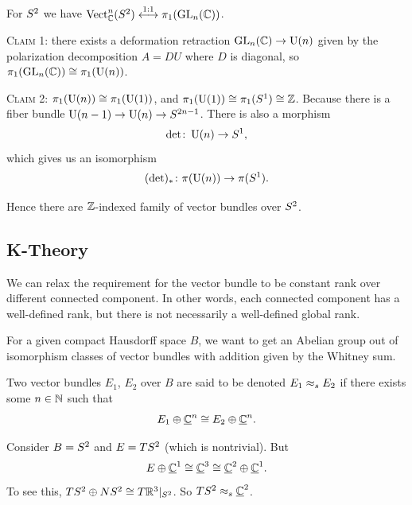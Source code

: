 \begin{node}
For $S^{2}$ we have
$\operatorname{Vect}^{n}_{\mathbb{C}}(S^{2})\stackrel{1:1}{\longleftrightarrow}\pi_{1}(\operatorname{GL}_{n}(\mathbb{C}))$.

\textsc{Claim 1}: there exists a deformation retraction $\operatorname{GL}_{n}(\mathbb{C})\to\operatorname{U}(n)$
given by the polarization decomposition $A=DU$ where $D$ is diagonal,
so $\pi_{1}(\operatorname{GL}_{n}(\mathbb{C}))\cong\pi_{1}(\operatorname{U}(n))$.

\textsc{Claim 2}: $\pi_{1}(\operatorname{U}(n))\cong\pi_{1}(\operatorname{U}(1))$, and
$\pi_{1}(\operatorname{U}(1))\cong\pi_{1}(S^{1})\cong\mathbb{Z}$. Because there is a
fiber bundle $\operatorname{U}(n-1)\to\operatorname{U}(n)\to S^{2n-1}$. There is also a morphism
\begin{equation}
\det\colon\operatorname{U}(n)\to S^{1},
\end{equation}
which gives us an isomorphism
\begin{equation}
(\det)_{*}\colon\pi(\operatorname{U}(n))\to\pi(S^{1}).
\end{equation}

Hence there are $\mathbb{Z}$-indexed family of vector bundles over $S^{2}$.
\end{node}

\subsection{K-Theory}

\begin{node}
We can relax the requirement for the vector bundle to be constant rank
over different connected component. In other words, each connected
component has a well-defined rank, but there is not necessarily a
well-defined global rank.
\end{node}

\begin{node}
For a given compact Hausdorff space $B$, we want to get an Abelian
group out of isomorphism classes of vector bundles with addition given
by the Whitney sum.
\end{node}

\begin{definition}
Two vector bundles $E_{1}$, $E_{2}$ over $B$ are said to be
 denoted $E_{1}\mathrel{\approx_{s}} E_{2}$ if there
exists some $n\in\mathbb{N}$ such that
\begin{equation*}
E_{1}\oplus\underline{\mathbb{C}}^{n}\cong E_{2}\oplus\underline{\mathbb{C}}^{n}.
\end{equation*}
\end{definition}

\begin{example}
Consider $B=S^{2}$ and $E=TS^{2}$ (which is nontrivial). But
\begin{equation}
E\oplus\underline{\mathbb{C}}^{1}\cong\underline{\mathbb{C}}^{3}\cong\underline{\mathbb{C}}^{2}\oplus\underline{\mathbb{C}}^{1}.
\end{equation}
To see this, $TS^{2}\oplus NS^{2}\cong T\mathbb{R}^{3}|_{S^{2}}$.
So $TS^{2}\mathrel{\approx_{s}}\underline{\mathbb{C}}^{2}$.
\end{example}

